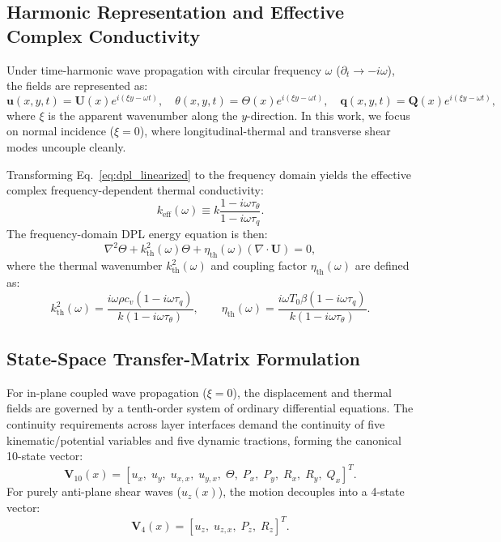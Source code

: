 \documentclass[11pt,a4paper]{article}
\begin{document}
\subsection{Harmonic Representation and Effective Complex Conductivity}
Under time-harmonic wave propagation with circular frequency $\omega$ ($\partial_t \to -i\omega$), the fields are represented as:
\begin{equation}
\mathbf{u}(x, y, t) = \mathbf{U}(x) e^{i(\xi y - \omega t)}, \quad \theta(x, y, t) = \Theta(x) e^{i(\xi y - \omega t)}, \quad \mathbf{q}(x, y, t) = \mathbf{Q}(x) e^{i(\xi y - \omega t)},
\label{eq:harmonic_ansatz}
\end{equation}
where $\xi$ is the apparent wavenumber along the $y$-direction. In this work, we focus on normal incidence ($\xi = 0$), where longitudinal-thermal and transverse shear modes uncouple cleanly. 

Transforming Eq.~\eqref{eq:dpl_linearized} to the frequency domain yields the effective complex frequency-dependent thermal conductivity:
\begin{equation}
k_{\text{eff}}(\omega) \equiv k \frac{1 - i \omega \tau_\theta}{1 - i \omega \tau_q}.
\label{eq:keff}
\end{equation}
The frequency-domain DPL energy equation is then:
\begin{equation}
\nabla^2 \Theta + k_{\text{th}}^2(\omega) \Theta + \eta_{\text{th}}(\omega) (\nabla \cdot \mathbf{U}) = 0,
\label{eq:dpl_helmholtz}
\end{equation}
where the thermal wavenumber $k_{\text{th}}^2(\omega)$ and coupling factor $\eta_{\text{th}}(\omega)$ are defined as:
\begin{equation}
k_{\text{th}}^2(\omega) = \frac{i \omega \rho c_v (1 - i \omega \tau_q)}{k (1 - i \omega \tau_\theta)}, \qquad \eta_{\text{th}}(\omega) = \frac{i \omega T_0 \beta (1 - i \omega \tau_q)}{k (1 - i \omega \tau_\theta)}.
\label{eq:thermal_wave_parameters}
\end{equation}

\subsection{State-Space Transfer-Matrix Formulation}
\label{sec:tmm}
For in-plane coupled wave propagation ($\xi = 0$), the displacement and thermal fields are governed by a tenth-order system of ordinary differential equations. The continuity requirements across layer interfaces demand the continuity of five kinematic/potential variables and five dynamic tractions, forming the canonical 10-state vector:
\begin{equation}
\mathbf{V}_{10}(x) = \left[ u_x, \; u_y, \; u_{x,x}, \; u_{y,x}, \; \Theta, \; P_x, \; P_y, \; R_x, \; R_y, \; Q_x \right]^T.
\label{eq:state_vector_10}
\end{equation}
For purely anti-plane shear waves ($u_z(x)$), the motion decouples into a 4-state vector:
\begin{equation}
\mathbf{V}_4(x) = \left[ u_z, \; u_{z,x}, \; P_z, \; R_z \right]^T.
\label{eq:state_vector_4}
\end{equation}
\end{document}
